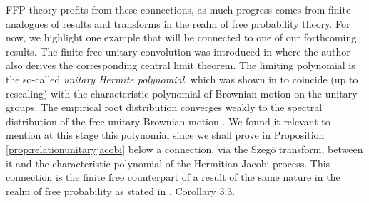 \documentclass[12pt,reqno]{amsart}
\begin{document}
FFP theory profits from these connections, as much progress comes from finite analogues of results and transforms in the realm of free probability theory. 
For now, we highlight one example that will be connected to one of our forthcoming results. The finite free unitary convolution was introduced in \cite{MR4285332} where 
the author also derives the corresponding central limit theorem. The limiting polynomial is the so-called \emph{unitary Hermite polynomial}, which was shown in \cite{MR4912666} to coincide (up to rescaling) with the characteristic polynomial of Brownian motion on the unitary groups. The empirical root distribution converges weakly to the spectral distribution of the free unitary Brownian motion \cite{MR4912666}. 
We found it relevant to mention at this stage this polynomial since we shall prove in Proposition \ref{prop:relationunitaryjacobi} below a connection, via the Szegö transform, between it and the characteristic polynomial of the Hermitian Jacobi process. This connection is the finite free counterpart of a result of the same nature in the realm of free probability as stated in \cite{MR3071702}, Corollary 3.3.
\end{document}
